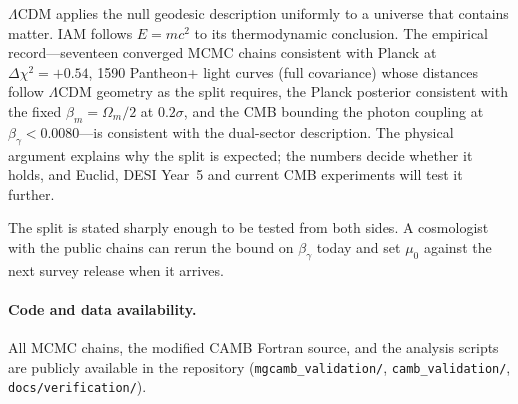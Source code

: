 $\Lambda$CDM applies the null geodesic description uniformly to a universe that contains matter. IAM follows $E=mc^2$ to its thermodynamic conclusion.
The empirical record---seventeen converged MCMC chains consistent with Planck at $\Delta\chi^2=+0.54$, 1590 Pantheon+ light curves (full covariance) whose distances follow
$\Lambda$CDM geometry as the split requires, the Planck posterior consistent with the fixed $\beta_m=\Omega_m/2$ at $0.2\sigma$, and the CMB bounding the
photon coupling at $\beta_\gamma<0.0080$---is consistent with the dual-sector description. The physical argument explains why the split is expected; the
numbers decide whether it holds, and Euclid, DESI Year~5 and current CMB experiments will test it further.

The split is stated sharply enough to be tested from both sides. A cosmologist with the public chains can rerun the bound on $\beta_\gamma$ today and set $\mu_0$ against the next survey release when it arrives.

\paragraph{Code and data availability.} All MCMC chains, the modified CAMB Fortran source, and the analysis scripts are publicly available in the
repository (\texttt{mgcamb\_validation/}, \texttt{camb\_validation/}, \texttt{docs/\allowbreak{}verification/}).
